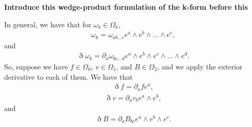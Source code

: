 \documentclass{book}
\begin{document}
\textbf{Introduce this wedge-product formulation of the k-form before this}

In general, we have that for $\omega_k \in \Omega_k$, \begin{gather}\omega_k = \omega_{ab...c}e^a\wedge e^b \wedge ... \wedge e^c,\end{gather} and \begin{gather} \eth \omega_k = \partial_a\omega_{bc...d}e^a\wedge e^b\wedge e^c\wedge ... \wedge e^d.\end{gather} So, suppose we have $f \in \Omega_0$, $v \in \Omega_1$, and $B \in \Omega_2$, and we apply the exterior derivative to each of them. We have that \begin{gather}\eth f = \partial_a f e^a,\end{gather} \begin{gather}\eth v = \partial_a v_b e^a \wedge e^b,\end{gather} and \begin{gather}\eth B = \partial_a B_{bc} e^a\wedge e^b \wedge e^c.\end{gather} 
\end{document}
